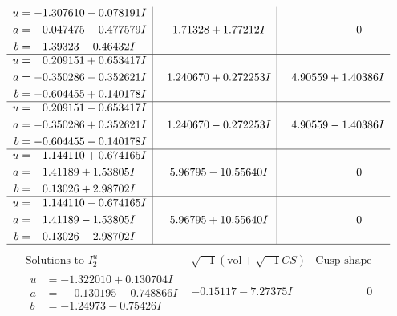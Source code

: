 \documentclass[1p]{elsarticle_modified}
\theoremstyle{definition}
\newcommand{\I}{\sqrt{-1}}
\begin{document}
$$\begin{array}{c|c|c}
\begin{aligned}
u &= -1.307610 - 0.078191 I \\
a &= \phantom{-}0.047475 - 0.477579 I \\
b &= \phantom{-}1.39323 - 0.46432 I\end{aligned}
 & \phantom{-}1.71328 + 1.77212 I & \phantom{-0.000000 } 0 \\ \hline\begin{aligned}
u &= \phantom{-}0.209151 + 0.653417 I \\
a &= -0.350286 - 0.352621 I \\
b &= -0.604455 + 0.140178 I\end{aligned}
 & \phantom{-}1.240670 + 0.272253 I & \phantom{-}4.90559 + 1.40386 I \\ \hline\begin{aligned}
u &= \phantom{-}0.209151 - 0.653417 I \\
a &= -0.350286 + 0.352621 I \\
b &= -0.604455 - 0.140178 I\end{aligned}
 & \phantom{-}1.240670 - 0.272253 I & \phantom{-}4.90559 - 1.40386 I \\ \hline\begin{aligned}
u &= \phantom{-}1.144110 + 0.674165 I \\
a &= \phantom{-}1.41189 + 1.53805 I \\
b &= \phantom{-}0.13026 + 2.98702 I\end{aligned}
 & \phantom{-}5.96795 - 10.55640 I & \phantom{-0.000000 } 0 \\ \hline\begin{aligned}
u &= \phantom{-}1.144110 - 0.674165 I \\
a &= \phantom{-}1.41189 - 1.53805 I \\
b &= \phantom{-}0.13026 - 2.98702 I\end{aligned}
 & \phantom{-}5.96795 + 10.55640 I & \phantom{-0.000000 } 0\\
 \hline 
 \end{array}$$\newpage$$\begin{array}{c|c|c}  
\text{Solutions to }I^u_{2}& \I (\text{vol} + \sqrt{-1}CS) & \text{Cusp shape}\\
 \hline 
\begin{aligned}
u &= -1.322010 + 0.130704 I \\
a &= \phantom{-}0.130195 - 0.748866 I \\
b &= -1.24973 - 0.75426 I\end{aligned}
 & -0.15117 - 7.27375 I & \phantom{-0.000000 } 0 \\ \hline\begin{aligned}

\end{aligned}
\end{array}$$
\end{document}
